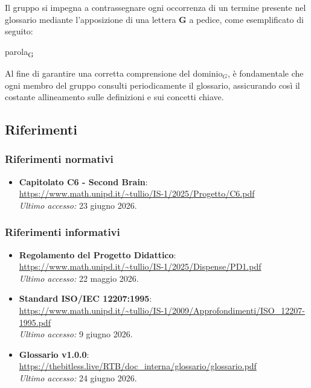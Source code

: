 \documentclass[a4paper, 10pt]{article}
\begin{document}
Il gruppo si impegna a contrassegnare ogni occorrenza di un termine presente nel glossario mediante l'apposizione di una lettera \textbf{G} a pedice, come esemplificato di seguito:

\noindent parola\textsubscript{G}

Al fine di garantire una corretta comprensione del dominio$_G$, è fondamentale che ogni membro del gruppo consulti periodicamente il glossario, assicurando così il costante allineamento sulle definizioni e sui concetti chiave.

\subsection{Riferimenti}

\subsubsection{Riferimenti normativi}
\begin{itemize}
    \item \textbf{Capitolato C6 - Second Brain}: \\
    \url{https://www.math.unipd.it/~tullio/IS-1/2025/Progetto/C6.pdf} \\
    \textit{Ultimo accesso:} 23 giugno 2026.
\end{itemize}

\subsubsection{Riferimenti informativi}
\begin{itemize}
    \item \textbf{Regolamento del Progetto Didattico}: \\
    \url{https://www.math.unipd.it/~tullio/IS-1/2025/Dispense/PD1.pdf} \\
    \textit{Ultimo accesso:} 22 maggio 2026.
    
    \item \textbf{Standard ISO/IEC 12207:1995}: \\
    \url{https://www.math.unipd.it/~tullio/IS-1/2009/Approfondimenti/ISO_12207-1995.pdf} \\
    \textit{Ultimo accesso:} 9 giugno 2026. \\
    
    \item \textbf{Glossario v1.0.0}: \\
    \url{https://thebitless.live/RTB/doc_interna/glossario/glossario.pdf} \\
    \textit{Ultimo accesso:} 24 giugno 2026. \\
\end{itemize}
\end{document}
